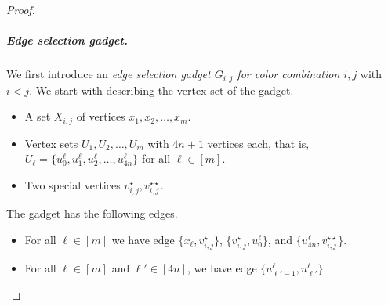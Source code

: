 \documentclass[a4paper,UKenglish,cleveref, autoref, thm-restate, anonymous]{lipics-v2021}
\begin{document}
\begin{proof}
    \subparagraph{Edge selection gadget.} We first introduce an \emph{edge selection gadget $G_{i,j}$ for color combination $i,j$} with $i<j$. We start with describing the vertex set of the gadget.
    \begin{itemize}
        \item A set $X_{i,j}$ of vertices $x_1, x_2, \ldots, x_m$.
        \item Vertex sets $U_1, U_2, \ldots, U_m$ with $4n+1$ vertices each, that is, $U_\ell=\{u^\ell_0, u^\ell_1, u^\ell_2,\ldots, 
        u^\ell_{4n}\}$ for all $\ell\in[m]$. 
        \item Two special vertices $v_{i,j}^\star,v_{i,j}^{\star\star}$.
    \end{itemize}
    The gadget has the following edges.
    \begin{itemize}
        \item For all $\ell\in [m]$ we have edge $\{x_\ell,v_{i,j}^\star\}$, $\{v_{i,j}^\star,u^\ell_0\}$, and $\{u^\ell_{4n},v_{i,j}^{\star\star}\}$. 

        \item For all $\ell\in [m]$ and $\ell'\in [4n]$, we have edge $\{u^\ell_{\ell'-1},u^\ell_{\ell'}\}$.
    \end{itemize}


\end{proof}
\end{document}
